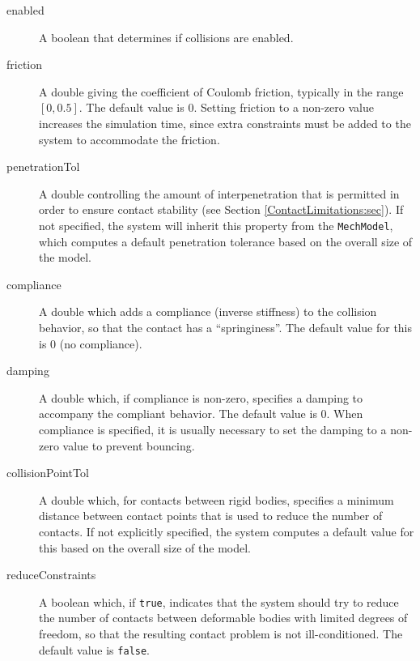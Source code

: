 \begin{description}

\item[enabled]\mbox{}

A boolean that determines if collisions are enabled.

\item[friction]\mbox{}

A double giving the coefficient of Coulomb friction, typically in the
range $[0,0.5]$. The default value is 0. Setting friction to a
non-zero value increases the simulation time, since extra constraints
must be added to the system to accommodate the friction. 

\item[penetrationTol]\mbox{}

A double controlling the amount of interpenetration that is permitted
in order to ensure contact stability (see Section
\ref{ContactLimitations:sec}). If not specified, the system will
inherit this property from the {\tt MechModel}, which computes a
default penetration tolerance based on the overall size of the model.

\item[compliance]\mbox{}

A double which adds a compliance (inverse stiffness) to the collision
behavior, so that the contact has a ``springiness''. The default
value for this is 0 (no compliance).

\item[damping]\mbox{}

A double which, if {\sf compliance} is non-zero, specifies a damping
to accompany the compliant behavior. The default value is 0.  When
compliance is specified, it is usually necessary to set the damping to
a non-zero value to prevent bouncing.

\item[collisionPointTol]\mbox{}

A double which, for contacts between rigid bodies, specifies a minimum
distance between contact points that is used to reduce the number of
contacts. If not explicitly specified, the system computes a
default value for this based on the overall size of the model.

\item[reduceConstraints]\mbox{}

A boolean which, if {\tt true}, indicates that the system should try
to reduce the number of contacts between deformable bodies with
limited degrees of freedom, so that the resulting contact problem is
not ill-conditioned.  The default value is {\tt false}.


\end{description}
